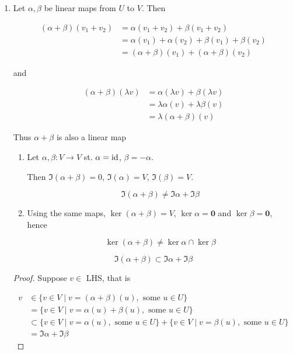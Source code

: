 \documentclass[a4paper]{article}
\begin{document}
\begin{enumerate}
	\item 	Let $ \alpha,\beta $ be linear maps from $ U $ to $ V $. Then
	
	\begin{align*}
	(\alpha + \beta)(v_{1} + v_{2})& = \alpha(v_{1}+v_{2}) + \beta(v_{1} + v_{2}) \\
	& = \alpha(v_{1}) + \alpha(v_{2}) + \beta(v_{1}) + \beta(v_{2})\\
	& = (\alpha + \beta)(v_{1}) + (\alpha + \beta)(v_{2})
 	\end{align*}
 	
 	and 
 	
 	\begin{align*}
 	(\alpha + \beta)(\lambda v)& = \alpha(\lambda v) + \beta(\lambda v) \\
 	& = \lambda \alpha(v) + \lambda \beta(v) \\
 	& = \lambda(\alpha + \beta)(v)
 	\end{align*}
 	
 	Thus $ \alpha + \beta $ is also a linear map
 	
	 	\begin{enumerate}[label = (\alph*)]
	 		\item Let $ \alpha, \beta: V \to V $ st. $ \alpha = \operatorname{id} $, $ \beta = - \alpha $.
	 		
	 		Then $ \Im(\alpha + \beta) = 0 $, $ \Im(\alpha) = V $, $ \Im(\beta) = V $.
	 		
	 		\[ \Im (\alpha + \beta) \neq \Im \alpha + \Im \beta  \]
	 		
	 		\item Using the same maps, $ \ker (\alpha + \beta) = V $, $ \ker \alpha = \mathbf{0}  $ and $ \ker \beta = \mathbf{0} $, hence 
	 		
	 		\[ \ker( \alpha + \beta) \neq \ker \alpha \cap \ker \beta \]
	 		
	 		\end{enumerate}
 		
	 		\begin{prop} 
	 			\[ \Im (\alpha + \beta) \subset \Im \alpha + \Im \beta  \]
	 		\end{prop}
 		
 		\begin{proof}
 			
 			Suppose $ v \in  $ LHS, that is
 			
 			\begin{align*}
 			 v & \in \{  v \in V \; | \; v  = (\alpha + \beta)(u), \text{ some } u \in U      \} \\
 			&  = \{  v \in V \; | \; v = \alpha(u) + \beta(u), \text{ some } u \in U      \}\\
 			&  \subset \{  v \in V \; | \; v = \alpha(u), \text{ some } u \in U  \} + \{  v \in V \; | \; v = \beta(u), \text{ some } u \in U      \} \\
 			& = \Im \alpha + \Im \beta
 			\end{align*}
 			

\end{proof}
\end{enumerate}
\end{document}
